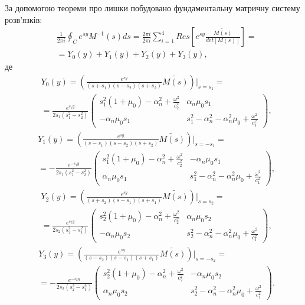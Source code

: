 За допомогою теореми про лишки побудовано фундаментальну матричну систему розв'язків:
\begin{align*}
    &\frac{1}{2\pi i} \oint_C e^{sy} M^{-1}(s)ds = \frac{2 \pi i}{2 \pi i} \sum_{i=1}^{4} Res\left[ e^{sy} \frac{\widetilde{M(s)}}{det[M(s)]} \right] = \\
    & = Y_0(y) + Y_1(y) + Y_2(y) + Y_3(y),
\end{align*}
де
\begin{align}
    &Y_0(y) =  \left( \frac{e^{sy}}{(s+s_1)(s - s_2)(s + s_2)} \widetilde{M(s)} \right) \Big|_{s=s_1} = \nonumber \\
    &=\frac{e^{s_1 y}}{2s_1 (s_1^2 - s_2^2)} \begin{pmatrix}
        s_1^2 (1 + \mu_0) -\alpha_n^2 + \frac{\omega^2}{c_2^2} & \alpha_n \mu_0 s_1 \\
        -\alpha_n \mu_0 s_1 & s_1^2 - \alpha_n^2 - \alpha_n^2\mu_0 + \frac{\omega^2}{c_1^2}
    \end{pmatrix},
\end{align}
\begin{align}
    &Y_1(y) =  \left( \frac{e^{sy}}{(s-s_1)(s - s_2)(s + s_2)} \widetilde{M(s)} \right) \Big|_{s=-s_1} = \nonumber \\
    &=-\frac{e^{-s_1 y}}{2s_1 (s_1^2 - s_2^2)} \begin{pmatrix}
        s_1^2 (1 + \mu_0) -\alpha_n^2 + \frac{\omega^2}{c_2^2} & -\alpha_n \mu_0 s_1 \\
        \alpha_n \mu_0 s_1 & s_1^2 - \alpha_n^2 - \alpha_n^2\mu_0 + \frac{\omega^2}{c_1^2}
    \end{pmatrix},
\end{align}
\begin{align}
    &Y_2(y) =  \left( \frac{e^{sy}}{(s+s_2)(s - s_1)(s + s_1)} \widetilde{M(s)} \right) \Big|_{s=s_2} = \nonumber \\
    &=\frac{e^{s_2 y}}{2s_2 (s_2^2 - s_1^2)} \begin{pmatrix}
        s_2^2 (1 + \mu_0) -\alpha_n^2 + \frac{\omega^2}{c_2^2} & \alpha_n \mu_0 s_2 \\
        -\alpha_n \mu_0 s_2 & s_2^2 - \alpha_n^2 - \alpha_n^2\mu_0 + \frac{\omega^2}{c_1^2}
    \end{pmatrix},
\end{align}
\begin{align}
    &Y_3(y) =  \left( \frac{e^{sy}}{(s-s_2)(s - s_1)(s + s_1)} \widetilde{M(s)} \right) \Big|_{s=-s_2} = \nonumber \\
    &=-\frac{e^{-s_2 y}}{2s_2 (s_2^2 - s_1^2)} \begin{pmatrix}
        s_2^2 (1 + \mu_0) -\alpha_n^2 + \frac{\omega^2}{c_2^2} & -\alpha_n \mu_0 s_2 \\
        \alpha_n \mu_0 s_2 & s_2^2 - \alpha_n^2 - \alpha_n^2\mu_0 + \frac{\omega^2}{c_1^2}
    \end{pmatrix}.
\end{align}


